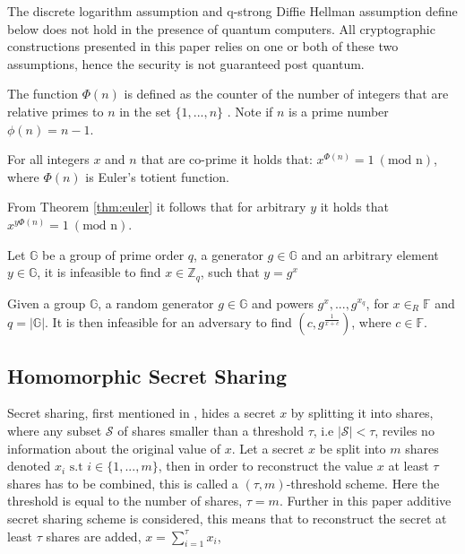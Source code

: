 The discrete logarithm assumption and q-strong Diffie Hellman assumption define below does not hold in the presence of quantum computers. All cryptographic constructions presented in this paper relies on one or both of these two assumptions, hence the security is not guaranteed post quantum. 

\begin{Mydef}
\end{Mydef}

\begin{Mydef}
The function $\Phi(n)$ is defined as the counter of the number of integers that are relative primes to $n$ in the set $\{1,...,n\}$ . Note if $n$ is a prime number $\phi(n) = n-1$.
\end{Mydef}
\vspace{10pt}
\begin{thm}
\label{thm:euler}
For all integers $x$ and $n$ that are co-prime it holds that:
$x^{\Phi(n)} = 1\:( \text{mod n})$, where $\Phi(n)$ is Euler's totient function.
\end{thm}
\vspace{10pt}
From Theorem \ref{thm:euler} it follows that for arbitrary $y$ it holds that $x^{y\Phi(n)} = 1 \:( \text{mod n})$.
\vspace{10pt}

\begin{Ass}
\label{ass:DLA}
Let $\mathds{G}$ be a group of prime order $q$, a generator $g\in \mathds{G}$ and an arbitrary element $y \in\mathds{G}$, it is  infeasible to find $x \in \mathds{Z}_q$, such that $y=g^x$
\end{Ass}

\vspace{10pt}
\begin{Ass}
 Given a group $\mathds{G}$, a random generator $g\in \mathds{G}$ and powers $g^x,...,g^{x_q}$, for $x \in_R \mathds{F}$ and  $q= |\mathds{G}|$. It is then  infeasible for an adversary to find $(c, g^{\frac{1}{x+c}})$, where $c \in \mathds{F}$.
\end{Ass}




\subsection*{Homomorphic Secret Sharing}
Secret sharing, first mentioned in \cite{How_share_A_secret}, hides a secret $x$ by splitting it into shares, where any subset $\mathcal{S}$ of shares smaller than a threshold $\tau$, i.e $|\mathcal{S}|<\tau$, reviles no information about the original value of $x$.  Let a secret $x$ be split into $m$ shares denoted $x_i \text{ s.t } i\in\{1,...,m\}$, then in order to reconstruct the value $x$ at least $\tau$ shares has to be combined, this is called a $(\tau,m)$-threshold scheme. Here the threshold is equal to the number of shares,  $\tau=m$. Further in this paper additive secret sharing scheme is considered, this means that to reconstruct the secret at least $\tau$ shares are added, $x = \sum_{i=1}^\tau x_i$,

